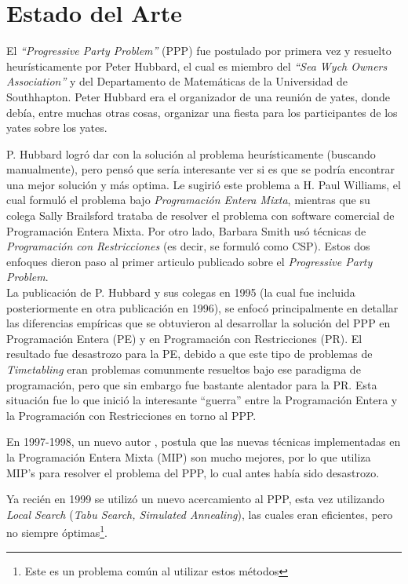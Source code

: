 \documentclass[letter, 10pt]{article}
\begin{document}
\section{Estado del Arte}
El \textit{``Progressive Party Problem''} (PPP) fue postulado por primera vez y resuelto heurísticamente por Peter Hubbard, el cual es miembro del \textit{``Sea Wych Owners Association''} y del Departamento de Matemáticas de la Universidad de Southhapton. Peter Hubbard era el organizador de una reunión de yates, donde debía, entre muchas otras cosas, organizar una fiesta para los participantes de los yates sobre los yates. \cite{ProblemDescription}

P. Hubbard logró dar con la solución al problema heurísticamente (buscando manualmente), pero pensó que sería interesante ver si es que se podría encontrar una mejor solución y más optima. Le sugirió este problema a H. Paul Williams, el cual formuló el problema bajo \textit{Programación Entera Mixta}, mientras que su colega Sally Brailsford trataba de resolver el problema con software comercial de Programación Entera Mixta. Por otro lado, Barbara Smith usó técnicas de \textit{Programación con Restricciones} (es decir, se formuló como CSP). Estos dos enfoques dieron paso al primer articulo publicado sobre el \textit{Progressive Party Problem}. \cite{FirstPublication}\\

La publicación de P. Hubbard y sus colegas en 1995 \cite{FirstPublication} (la cual fue incluida posteriormente en otra publicación en 1996), se enfocó principalmente en detallar las diferencias empíricas que se obtuvieron al desarrollar la solución del PPP en Programación Entera (PE) y en Programación con Restricciones (PR). El resultado fue desastrozo para la PE, debido a que este tipo de problemas de \textit{Timetabling} eran problemas comunmente resueltos bajo ese paradigma de programación, pero que sin embargo fue bastante alentador para la PR. Esta situación fue lo que inició la interesante ``guerra'' entre la Programación Entera y la Programación con Restricciones en torno al PPP.

En 1997-1998, un nuevo autor \cite{PseudoLocal,WalserThesis}, postula que las nuevas técnicas implementadas en la Programación Entera Mixta (MIP) son mucho mejores, por lo que utiliza MIP's para  resolver el problema del PPP, lo cual antes había sido desastrozo.

Ya recién en 1999 se utilizó un nuevo acercamiento al PPP, esta vez utilizando \textit{Local Search} (\textit{Tabu Search, Simulated Annealing}), las cuales eran eficientes, pero no siempre óptimas\footnote{Este es un problema común al utilizar estos métodos}.
\end{document}
